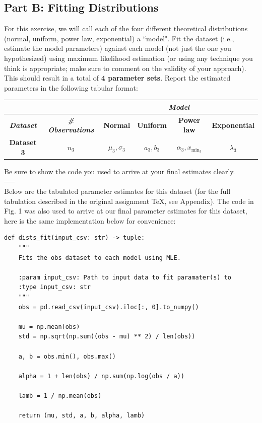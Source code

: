 \newpage
\subsection{Part B: Fitting Distributions}
For this exercise, we will call each of the four different theoretical distributions (normal, uniform, power law, exponential) a ``model". Fit the dataset (i.e., estimate the model parameters) against each model (not just the one you hypothesized) using maximum likelihood estimation (or using any technique you think is appropriate; make sure to comment on the validity of your approach). This should result in a total of \textbf{4 parameter sets}. Report the estimated parameters in the following tabular format:

\begin{center}
\begin{tabular}{|c|c|c|c|c|c|}
\hline
& & \multicolumn{4}{c|}{{\bf{\em{Model}}}}\\
\hline
{{\bf{\em{Dataset}}}} & {\bf{\em{\# Observations}}} &\textbf{Normal}& \textbf{Uniform} & \textbf{Power law} & \textbf{Exponential} \\
\hline
\textbf{Dataset 3} & $n_3$ & $\mu_3, \sigma_3$ & $a_3, b_3$ & $\alpha_3, x_{\min_3}$ & $\lambda_3$ \\
\hline
\end{tabular}
\end{center}

Be sure to show the code you used to arrive at your final estimates clearly.\\
-----\\
Below are the tabulated parameter estimates for this dataset (for the full tabulation described in the original assignment TeX, see Appendix). The code in Fig. 1 was also used to arrive at our final parameter estimates for this dataset, here is the same implementation below for convenience:\\
\begin{verbatim}
def dists_fit(input_csv: str) -> tuple:
    """
    Fits the obs dataset to each model using MLE.

    :param input_csv: Path to input data to fit paramater(s) to
    :type input_csv: str
    """
    obs = pd.read_csv(input_csv).iloc[:, 0].to_numpy()

    mu = np.mean(obs)
    std = np.sqrt(np.sum((obs - mu) ** 2) / len(obs))

    a, b = obs.min(), obs.max()

    alpha = 1 + len(obs) / np.sum(np.log(obs / a))

    lamb = 1 / np.mean(obs)

    return (mu, std, a, b, alpha, lamb)
\end{verbatim}

